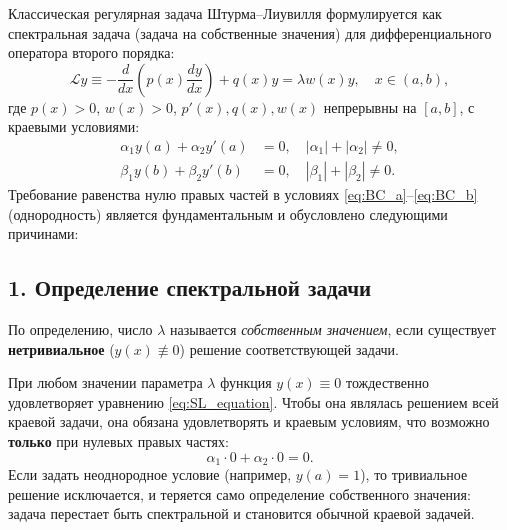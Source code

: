 \documentclass[12pt,a4paper]{article}
\begin{document}
Классическая регулярная задача Штурма--Лиувилля формулируется как спектральная задача (задача на собственные значения) для дифференциального оператора второго порядка:
\begin{equation}
    \mathcal{L}y \equiv -\frac{d}{dx}\left(p(x)\frac{dy}{dx}\right) + q(x)y = \lambda w(x)y, \quad x \in (a, b),
    \label{eq:SL_equation}
\end{equation}
где $p(x) > 0$, $w(x) > 0$, $p'(x), q(x), w(x)$ непрерывны на $[a, b]$, с краевыми условиями:
\begin{align}
    \alpha_1 y(a) + \alpha_2 y'(a) &= 0, \quad |\alpha_1| + |\alpha_2| \neq 0, \label{eq:BC_a} \\
    \beta_1 y(b) + \beta_2 y'(b) &= 0, \quad |\beta_1| + |\beta_2| \neq 0. \label{eq:BC_b}
\end{align}
Требование равенства нулю правых частей в условиях \eqref{eq:BC_a}--\eqref{eq:BC_b} (однородность) является фундаментальным и обусловлено следующими причинами:

\subsection*{1. Определение спектральной задачи}
По определению, число $\lambda$ называется \textit{собственным значением}, если существует \textbf{нетривиальное} ($y(x) \not\equiv 0$) решение соответствующей задачи. 

При любом значении параметра $\lambda$ функция $y(x) \equiv 0$ тождественно удовлетворяет уравнению \eqref{eq:SL_equation}. Чтобы она являлась решением всей краевой задачи, она обязана удовлетворять и краевым условиям, что возможно \textbf{только} при нулевых правых частях:
\begin{equation*}
    \alpha_1 \cdot 0 + \alpha_2 \cdot 0 = 0.
\end{equation*}
Если задать неоднородное условие (например, $y(a) = 1$), то тривиальное решение исключается, и теряется само определение собственного значения: задача перестает быть спектральной и становится обычной краевой задачей.
\end{document}
